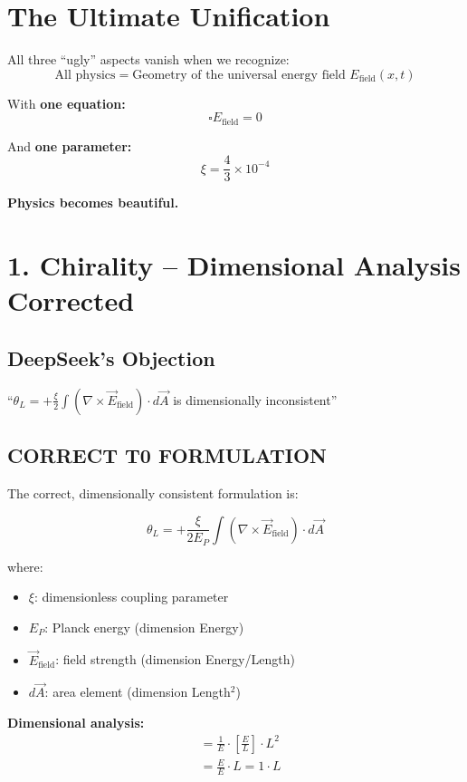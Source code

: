 	
	
	\section*{The Ultimate Unification}
	
	All three ``ugly'' aspects vanish when we recognize:
	\[
	\boxed{\text{All physics} = \text{Geometry of the universal energy field } E_{\text{field}}(x,t)}
	\]
	
	With \textbf{one equation:}
	\[
	\square E_{\text{field}} = 0
	\]
	
	And \textbf{one parameter:}
	\[
	\xi = \frac{4}{3} \times 10^{-4}
	\]
	
	\textbf{Physics becomes beautiful.}
	
	\section*{1. Chirality – Dimensional Analysis Corrected}
	
	\subsection*{DeepSeek's Objection}
	``$\theta_L = +\frac{\xi}{2} \int (\nabla \times \vec{E}_{\text{field}}) \cdot d\vec{A}$ is dimensionally inconsistent''
	
	\subsection*{\textbf{CORRECT T0 FORMULATION}}
	
	The correct, dimensionally consistent formulation is:
	
	\[
	\theta_L = +\frac{\xi}{2E_P} \int (\nabla \times \vec{E}_{\text{field}}) \cdot d\vec{A}
	\]
	
	where:
	\begin{itemize}
		\item $\xi$: dimensionless coupling parameter
		\item $E_P$: Planck energy (dimension Energy)
		\item $\vec{E}_{\text{field}}$: field strength (dimension Energy/Length)
		\item $d\vec{A}$: area element (dimension Length$^2$)
	\end{itemize}
	
	\textbf{Dimensional analysis:}
	\begin{align*}
		[\theta_L] &= \frac{1}{E} \cdot \left[\frac{E}{L}\right] \cdot L^2 \\
		&= \frac{E}{E} \cdot L = 1 \cdot L
	\end{align*}
	
